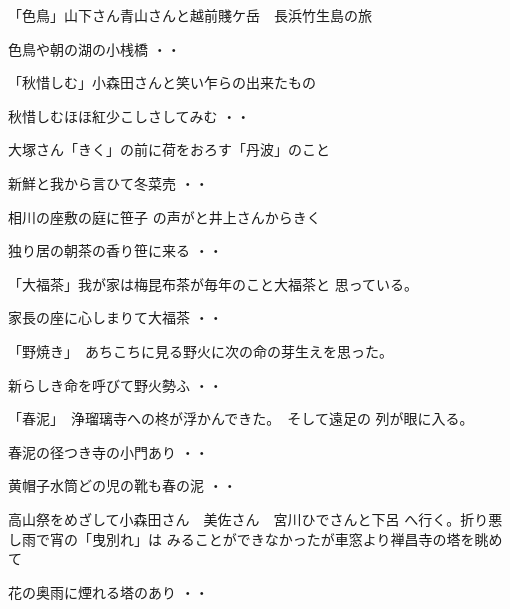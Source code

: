 \vspace{0.6cm}
「色鳥」山下さん青山さんと越前賤ケ岳　長浜竹生島の旅
\begin{shiika}色鳥や朝の湖の小桟橋
\hfill{・・}\end{shiika}
\vspace{0.6cm}
「秋惜しむ」小森田さんと笑い乍らの出来たもの
\begin{shiika}秋惜しむほほ紅少こしさしてみむ
\hfill{・・}\end{shiika}
\vspace{0.6cm}
大塚さん「きく」の前に荷をおろす「丹波」のこと
\begin{shiika}新鮮と我から言ひて冬菜売
\hfill{・・}\end{shiika}
\vspace{0.6cm}
相川の座敷の庭に笹子
の声がと井上さんからきく
\begin{shiika}独り居の朝茶の香り笹に来る
\hfill{・・}\end{shiika}
\vspace{0.6cm}
「大福茶」我が家は梅昆布茶が毎年のこと大福茶と
思っている。
\begin{shiika}家長の座に心しまりて大福茶
\hfill{・・}\end{shiika}
\vspace{0.6cm}
「野焼き」　あちこちに見る野火に次の命の芽生えを思った。
\begin{shiika}新らしき命を呼びて野火勢ふ
\hfill{・・}\end{shiika}
\vspace{0.6cm}
「春泥」　浄瑠璃寺への柊が浮かんできた。　そして遠足の
列が眼に入る。
\begin{shiika}春泥の径つき寺の小門あり
\hfill{・・}\end{shiika}
\begin{shiika}黄帽子水筒どの児の靴も春の泥
\hfill{・・}\end{shiika}
\vspace{0.6cm}
高山祭をめざして小森田さん　美佐さん　宮川ひでさんと下呂
へ行く。折り悪し雨で宵の「曳別れ」は
みることができなかったが車窓より禅昌寺の塔を眺めて
\begin{shiika}花の奥雨に煙れる塔のあり
\hfill{・・}\end{shiika}
